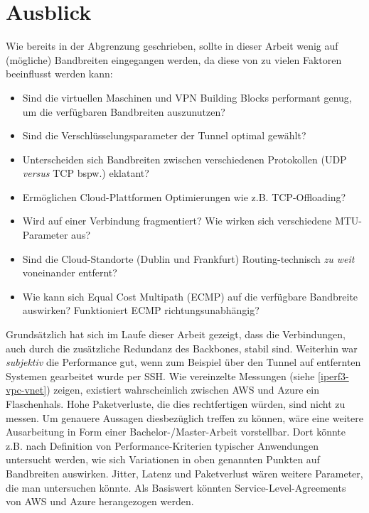 \section{Ausblick}\label{ausblick}
Wie bereits in der Abgrenzung geschrieben, sollte in dieser Arbeit wenig auf (mögliche) Bandbreiten eingegangen werden, da diese von zu vielen Faktoren beeinflusst werden kann:
\begin{itemize}
    \item Sind die virtuellen Maschinen und VPN Building Blocks performant genug, um die verfügbaren Bandbreiten auszunutzen?
    \item Sind die Verschlüsselungsparameter der Tunnel optimal gewählt?
    \item Unterscheiden sich Bandbreiten zwischen verschiedenen Protokollen (UDP \textit{versus} TCP bspw.) eklatant?
    \item Ermöglichen Cloud-Plattformen Optimierungen wie z.B. TCP-Offloading?
    \item Wird auf einer Verbindung fragmentiert? Wie wirken sich verschiedene MTU-Parameter aus?
    \item Sind die Cloud-Standorte (Dublin und Frankfurt) Routing-technisch \textit{zu weit} voneinander entfernt?
    \item Wie kann sich Equal Cost Multipath (ECMP) auf die verfügbare Bandbreite auswirken? Funktioniert ECMP richtungsunabhängig?
\end{itemize}
Grundsätzlich hat sich im Laufe dieser Arbeit gezeigt, dass die Verbindungen, auch durch die zusätzliche Redundanz des Backbones, stabil sind. Weiterhin war \textit{subjektiv} die Performance gut, wenn zum Beispiel über den Tunnel auf entfernten Systemen gearbeitet wurde per SSH. Wie vereinzelte Messungen (siehe \ref{iperf3-vpc-vnet}) zeigen, existiert wahrscheinlich zwischen AWS und Azure ein Flaschenhals. Hohe Paketverluste, die dies rechtfertigen würden, sind nicht zu messen.
Um genauere Aussagen diesbezüglich treffen zu können, wäre eine weitere Ausarbeitung in Form einer Bachelor-/Master-Arbeit vorstellbar. Dort könnte z.B. nach Definition von Performance-Kriterien typischer Anwendungen untersucht werden, wie sich Variationen in oben genannten Punkten auf Bandbreiten auswirken. Jitter, Latenz und Paketverlust wären weitere Parameter, die man untersuchen könnte. Als Basiswert könnten Service-Level-Agreements von AWS und Azure herangezogen werden.\\
